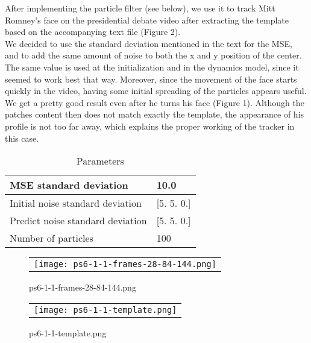 \documentclass[a4paper,11pt]{article}
\begin{document}
After implementing the particle filter (see below), we use it to track Mitt Romney's face on the presidential debate video after extracting the template based on the accompanying text file (Figure 2).\\
We decided to use the standard deviation mentioned in the text for the MSE, and to add the same amount of noise to both the x and y position of the center.\\
The same value is used at the initialization and in the dynamics model, since it seemed to work best that way.
Moreover, since the movement of the face starts quickly in the video, having some initial spreading of the particles appears useful.
We get a pretty good result even after he turns his face (Figure 1). Although the patches content then does not match exactly the template, the appearance of his profile is not too far away, which explains the proper working of the tracker in this case.


\begin{table}[H]
\centering
\caption{Parameters}
\begin{tabular}{|l|l|}
\hline
MSE standard deviation           & 10.0           \\ \hline
Initial noise standard deviation & {[}5. 5. 0.{]} \\ \hline
Predict noise standard deviation & {[}5. 5. 0.{]} \\ \hline
Number of particles              & 100            \\ \hline
\end{tabular}
\end{table}

\lstset{style=mystyle}



\begin{figure}[H]
\begin{center}
\begin{tabular}{c}
	\texttt{[image: ps6-1-1-frames-28-84-144.png]}\\
\end{tabular}
\end{center}
\caption{ps6-1-1-frames-28-84-144.png}
\label{ps-6-1-a}
\end{figure}

\begin{figure}[H]
\begin{center}
\begin{tabular}{c}
	\texttt{[image: ps6-1-1-template.png]}\\
\end{tabular}
\end{center}
\caption{ps6-1-1-template.png}
\label{ps-6-1-b}
\end{figure}
\end{document}
